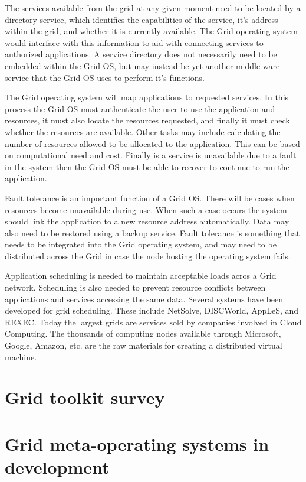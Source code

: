 \documentclass{article}
\begin{document}
The services available from the grid at any given moment need to be located by a directory service, which identifies the capabilities of the service, it's address within the grid, and whether it is currently available. The Grid operating system would interface with this information to aid with connecting services to authorized applications. A service directory does not necessarily need to be embedded within the Grid OS, but may instead be yet another middle-ware service that the Grid OS uses to perform it's functions.  

The Grid operating system will map applications to requested services. In this process the Grid OS must authenticate the user to use the application and resources, it must also locate the resources requested, and finally it must check whether the resources are available. Other tasks may include calculating the number of resources allowed to be allocated to the application. This can be based on computational need and cost. Finally is a service is unavailable due to a fault in the system then the Grid OS must be able to recover to continue to run the application. 

Fault tolerance is an important function of a Grid OS. There will be cases when resources become unavailable during use. When such a case occurs the system should link the application to a new resource address automatically. Data may also need to be restored using a backup service. Fault tolerance is something that needs to be integrated into the Grid operating system, and may need to be distributed across the Grid in case the node hosting the operating system fails.  

Application scheduling is needed to maintain acceptable loads acros a Grid network. Scheduling is also needed to prevent resource conflicts between applications and services accessing the same data. Several systems have been developed for grid scheduling. These include NetSolve, DISCWorld, AppLeS, and REXEC. \citep{nimrod} Today the largest grids are services sold by companies involved in Cloud Computing. The thousands of computing nodes available through Microsoft, Google, Amazon, etc. are the raw materials for creating a distributed virtual machine. 

\section{Grid toolkit survey}

\section{Grid meta-operating systems in development}
\end{document}
